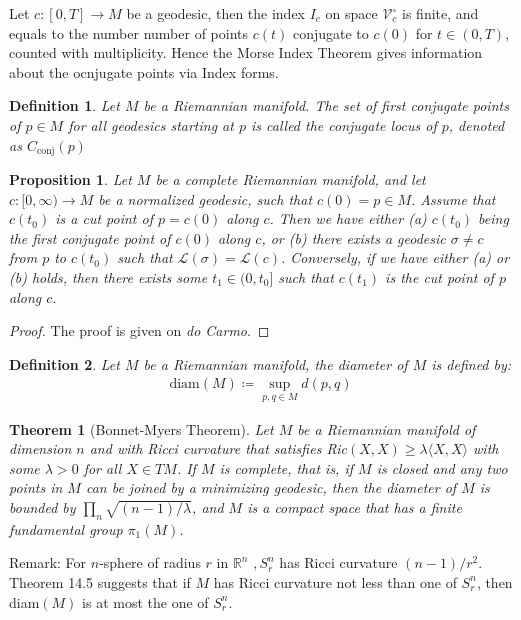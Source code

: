 \documentclass[11pt]{book}
\theoremstyle{break}
\theoremstyle{break}
\newtheorem{thm}{Theorem}[section]
\newtheorem{prop}[lem]{Proposition}
\newtheorem{defn}{Definition}[corL]
\newcommand{\R}{\mathbb{R}}
\newcommand{\remark}{\color{blue}Remark: \color{black}}
\begin{document}
Let $c:[0,T] \to M$ be a geodesic, then the index $I_c$ on space $\mathcal{V}_c^\circ$ is finite, and equals to the number number of points $c(t)$ conjugate to $c(0)$ for $t \in (0,T)$, counted with multiplicity. Hence the Morse Index Theorem gives information about the ocnjugate points via Index forms.

\begin{defn}
Let $M$ be a Riemannian manifold. The set of first conjugate points of $p \in M$ for all geodesics starting at $p$ is called the conjugate locus of $p$, denoted as $C_{\text{conj}}(p)$
\end{defn} 

\begin{prop}
Let $M$ be a complete Riemannian manifold, and let $c:[0,\infty) \to M$ be a normalized geodesic, such that $c(0) = p \in M$. Assume that $c(t_0)$ is a cut point of $p = c(0)$ along $c$. Then we have either (a) $c(t_0)$ being the first conjugate point of $c(0)$ along $c$, or (b) there exists a geodesic $\sigma \neq c$ from $p$ to $c(t_0)$ such that $\mathcal{L}(\sigma)  = \mathcal{L}(c)$. Conversely, if we have either (a) or (b) holds, then there exists some $t_1 \in (0,t_0]$ such that $c(t_1)$ is the cut point of $p$ along $c$. 
\end{prop}
\begin{proof}
The proof is given on \textit{do Carmo}.
\end{proof}


\newpage
\begin{defn}
Let $M$ be a Riemannian manifold, the diameter of $M$ is defined by:
\begin{align*}
\text{diam}(M) \coloneqq \sup_{p,q \in M}d(p,q) 
\end{align*}
\end{defn}

\begin{thm}[Bonnet-Myers Theorem]
Let $M$ be a Riemannian manifold of dimension $n$ and with Ricci curvature that satisfies Ric$(X,X) \geq \lambda \langle X,X\rangle$ with some $\lambda>0$ for all $X \in TM$. If $M$ is complete, that is, if $M$ is closed and any two points in $M$ can be joined by a minimizing geodesic, then the diameter of $M$ is bounded by $\prod_n \sqrt{(n-1)/\lambda}$, and $M$ is a compact space that has a finite fundamental group $\pi_1(M)$. 
\end{thm}
\remark For $n$-sphere of radius $r$ in $\R^n$ $, S_r^n$ has Ricci curvature $(n-1)/r^2$. Theorem 14.5 suggests that if $M$ has Ricci curvature not less than one of $S_r^n$, then diam$(M)$ is at most the one of $S_r^n$. 
\end{document}
